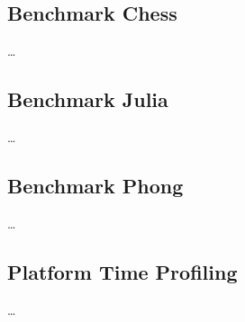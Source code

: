 \subsection{Benchmark Chess}
\label{sec:methodology_experimentmethodology_benchmarkchess}
\ldots

\subsection{Benchmark Julia}
\label{sec:methodology_experimentmethodology_benchmarkjulia}
\ldots

\subsection{Benchmark Phong}
\label{sec:methodology_experimentmethodology_benchmarkphong}
\ldots

\subsection{Platform Time Profiling}
\label{sec:methodology_experimentmethodology_platoformtimeprofiling}
\ldots




